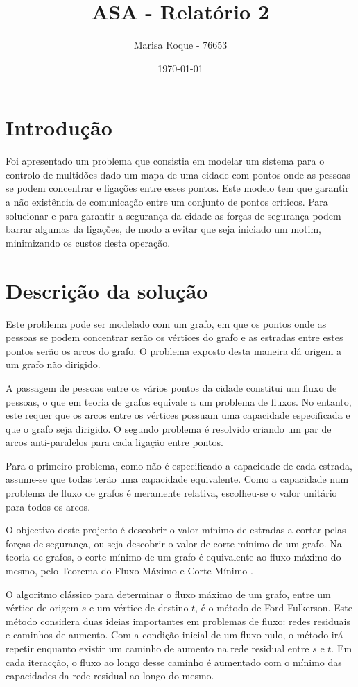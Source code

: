 \documentclass[12pt]{article}
\title{ASA - Relatório 2}
\author{Marisa Roque - 76653}
\date{\today}
\begin{document}
\maketitle


\section*{Introdução}

Foi apresentado um problema que consistia em modelar um sistema para o controlo de multidões dado um mapa de uma cidade com pontos onde as pessoas se podem concentrar e ligações entre esses pontos. Este modelo tem que garantir a não existência de comunicação entre um conjunto de pontos críticos. Para solucionar e para garantir a segurança da cidade as forças de segurança podem barrar algumas da ligações, de modo a evitar que seja iniciado um motim, minimizando os custos desta operação.


\section*{Descrição da solução}

Este problema pode ser modelado com um grafo, em que os pontos onde as pessoas se podem concentrar serão os vértices do grafo e as estradas entre estes pontos serão os arcos do grafo. O problema exposto desta maneira dá origem a um grafo não dirigido. 

A passagem de pessoas entre os vários pontos da cidade constitui um fluxo de pessoas, o que em teoria de grafos equivale a um problema de fluxos. No entanto, este requer que os arcos entre os vértices possuam uma capacidade especificada e que o grafo seja dirigido. O segundo problema é resolvido criando um par de arcos anti-paralelos para cada ligação entre pontos. 

Para o primeiro problema, como não é especificado a capacidade de cada estrada, assume-se que todas terão uma capacidade equivalente. Como a capacidade num problema de fluxo de grafos é meramente relativa, escolheu-se o valor unitário para todos os arcos.

O objectivo deste projecto é descobrir o valor mínimo de estradas a cortar pelas forças de segurança, ou seja descobrir o valor de corte mínimo de um grafo. Na teoria de grafos, o corte mínimo de um grafo é equivalente ao fluxo máximo do mesmo, pelo Teorema do Fluxo Máximo e Corte Mínimo \cite{lamport94}.

O algoritmo clássico para determinar o fluxo máximo de um grafo, entre um vértice de origem $s$ e um vértice de destino $t$, é o método de Ford-Fulkerson. Este método considera duas ideias importantes em problemas de fluxo: redes residuais e caminhos de aumento. 
Com a condição inicial de um fluxo nulo, o método irá repetir enquanto existir um caminho de aumento na rede residual entre $s$ e $t$.  Em cada iteracção, o fluxo ao longo desse caminho é aumentado com o mínimo das capacidades da rede residual ao longo do mesmo. 
\end{document}
